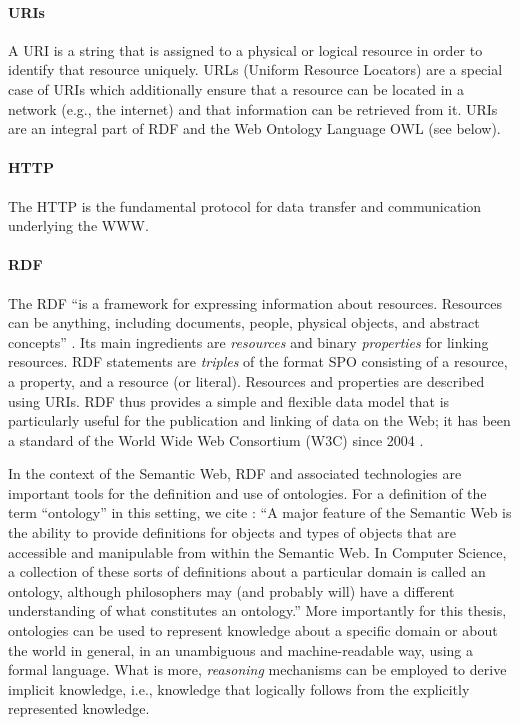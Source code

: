 \paragraph{URIs}
A \gls{URI} is a string that is assigned to a physical or logical resource
in order to identify that resource uniquely. URLs (Uniform Resource Locators)
are a special case of URIs which additionally ensure that a resource
can be located in a network (e.g., the internet) and that information can be retrieved from it.
URIs are an integral part of RDF and the Web Ontology Language OWL (see below).

\paragraph{HTTP}
The \gls{HTTP} is the fundamental protocol for data transfer and communication underlying the \gls{WWW}.

\paragraph{RDF}
The \gls{RDF} \enquote{is a framework for expressing information about resources. Resources can be anything, including documents, people, physical objects, and abstract concepts}
\autocite{RDFPrimer}.
Its main ingredients are \emph{resources} and binary \emph{properties} for linking resources.
RDF statements are \emph{triples} of the format \gls{SPO}
consisting of a resource, a property, and a resource (or literal).
Resources and properties are described using \glspl{URI}.
RDF thus provides a simple and flexible data model that is particularly useful for the publication
and linking of data on the Web;
it has been a standard of the
World Wide Web Consortium (W3C) since 2004 \autocite{W3CRDF}.

\par\medskip
In the context of the Semantic Web, \gls{RDF} and associated technologies
are important tools for the definition and use of ontologies.
For a definition of the term \enquote{ontology} in this setting, we cite \textcite{Horrocks2011}:
\enquote{A major feature of the Semantic Web is the ability to provide definitions for objects and types of objects that are accessible and manipulable from within the Semantic Web. In Computer Science, a collection of these sorts of definitions about a particular domain is called an ontology, although philosophers may (and probably will) have a different understanding of what constitutes an ontology.}
More importantly for this thesis, ontologies can be used to represent knowledge about a specific domain
or about the world in general, in an unambiguous and machine-readable way, using a formal language.
What is more, \emph{reasoning} mechanisms can be employed to derive implicit knowledge,
i.e., knowledge that logically follows from the explicitly represented knowledge.

